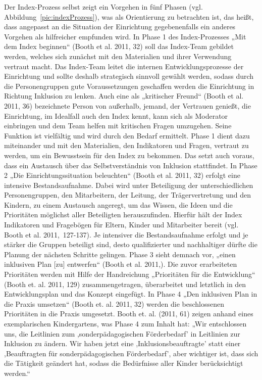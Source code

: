 Der Index-Prozess selbst zeigt ein Vorgehen in fünf Phasen (vgl. Abbildung~\ref{pic:indexProzess}), was als Orientierung zu betrachten ist, das heißt, dass angepasst an die Situation der Einrichtung gegebenenfalls ein anderes Vorgehen als hilfreicher empfunden wird.  
In Phase 1 des Index-Prozesses „Mit dem Index beginnen“ (Booth et al. 2011, 32) soll das Index-Team gebildet werden, welches sich zunächst mit den Materialien und ihrer Verwendung vertraut macht. Das Index-Team leitet die internen Entwicklungsprozesse der Einrichtung und sollte deshalb strategisch sinnvoll gewählt werden, sodass durch die Personengruppen gute Voraussetzungen geschaffen werden die Einrichtung in Richtung Inklusion zu lenken. Auch eine als „kritischer Freund“ (Booth et al. 2011, 36) bezeichnete Person von außerhalb, jemand, der Vertrauen genießt, die Einrichtung, im Idealfall auch den Index kennt, kann sich als Moderator einbringen und dem Team helfen mit kritischen Fragen umzugehen. Seine Funktion ist vielfältig und wird durch den Bedarf ermittelt. Phase 1 dient dazu miteinander und mit den Materialien, den Indikatoren und Fragen, vertraut zu werden, um ein Bewusstsein für den Index zu bekommen. Das setzt auch voraus, dass ein Austausch über das Selbstverständnis von Inklusion stattfindet.  
In Phase 2 „Die Einrichtungssituation beleuchten“ (Booth et al. 2011, 32) erfolgt eine intensive Bestandsaufnahme. Dabei wird unter Beteiligung der  unterschiedlichen Personengruppen, den Mitarbeitern, der Leitung, der Trägervertretung und den Kindern, zu einem Austausch angeregt, um das Wissen, die Ideen und die Prioritäten möglichst aller Beteiligten herauszufinden. Hierfür hält der Index Indikatoren und Fragebögen für Eltern, Kinder und Mitarbeiter bereit (vgl. Booth et al. 2011,~127-137). Je intensiver die Bestandsaufnahme erfolgt und je stärker die Gruppen beteiligt sind, desto qualifizierter und nachhaltiger dürfte die Planung der nächsten Schritte gelingen. 
Phase 3 sieht demnach vor, „einen inklusiven Plan [zu] entwerfen“ (Booth et al. 2011,). Die zuvor erarbeiteten Prioritäten werden mit Hilfe der Handreichung „Prioritäten für die Entwicklung“ (Booth et. al. 2011, 129) zusammengetragen, überarbeitet und letztlich in den Entwicklungsplan und das Konzept eingefügt.
In Phase 4 „Den inklusiven Plan in die Praxis umsetzen“ (Booth et. al. 2011, 32) werden die beschlossenen Prioritäten in die Praxis umgesetzt.  
Booth et. al. (2011, 61) zeigen anhand eines exemplarischen Kindergartens, was Phase 4 zum Inhalt hat: „Wir entschlossen uns, die Leitlinien zum ,sonderpädagogischen Förderbedarf' in Leitlinien zur Inklusion zu ändern. Wir haben jetzt eine ,Inklusionsbeauftragte' statt einer ,Beauftragten für sonderpädagogischen Förderbedarf', aber wichtiger ist, dass sich die Tätigkeit geändert hat, sodass die Bedürfnisse aller Kinder berücksichtigt werden.“   
